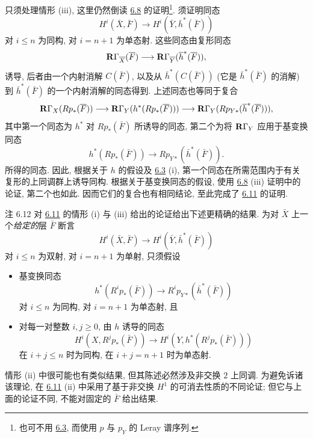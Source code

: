 只须处理情形 (iii), 这里仍然倒读 \hyperref[XII.prop6.8]{6.8} 的证明\footnote[1]{也可不用 \hyperref[XII.cor6.3]{6.3}, 而使用 $p$ 与 $p_Y$ 的 Leray 谱序列.}. 须证明同态
$$
H^{i}(\bar{X},\bar{F})\longrightarrow
H^{i}(\bar{Y},\bar{h}^{\ast}(\bar{F}))
$$
对 $i\leq n$ 为同构, 对 $i=n+1$ 为单态射. 这些同态由复形同态
$$
\mathbf{R}\Gamma_{\overline{X}}(\overline{F})\longrightarrow
\mathbf{R}\Gamma_{\overline{Y}}(\overline{h}^{\ast}(\overline{F})){},
$$
诱导, 后者由一个内射消解 $C(\bar{F})$, 以及从 $\bar{h}^{\ast}(C(\bar{F}))$ (它是 $\bar{h}^{\ast}(\bar{F})$ 的消解) 到 $\bar{h}^{\ast}(\bar{F})$ 的一个内射消解的同态得到. 上述同态也等同于复合
$$
\mathbf{R}\Gamma_X(Rp_{\ast}(\overline{F}))\longrightarrow
\mathbf{R}\Gamma_Y(h^{\ast}(Rp_{\ast}(\overline{F})))\longrightarrow
\mathbf{R}\Gamma_Y(Rp_{Y\ast}(\overline{h}^{\ast}(\overline{F}))){},
$$
其中第一个同态为 $h^{\ast}$ 对 $Rp_{\ast}(\bar{F})$ 所诱导的同态, 第二个为将 $\mathbf{R}\Gamma_Y$ 应用于基变换同态
$$
h^{\ast}(Rp_{\ast}(\bar{F}))\longrightarrow
Rp_{Y\ast}(\bar{h}^{\ast}(\bar{F})).
$$
所得的同态. 因此, 根据关于 $h$ 的假设及 \hyperref[XII.cor6.3]{6.3} (i), 第一个同态在所需范围内于有关复形的上同调群上诱导同构. 根据关于基变换同态的假设, 使用 \hyperref[XII.prop6.8]{6.8} (iii) 证明中的论证, 第二个也如此. 因而它们的复合也有相同结论, 至此完成了 \hyperref[XII.prop6.11]{6.11} 的证明.

\begin{enonce*}[remark]{注 6.12}
对 \hyperref[XII.prop6.11]{6.11} 的情形 (i) 与 (iii) 给出的论证\pageoriginale 给出下述更精确的结果. 为对 $\bar{X}$ 上一个\emph{给定的}层 $\bar{F}$ 断言
$$
H^{i}(\bar{X},\bar{F})\longrightarrow
H^{i}(\bar{Y},\bar{h}^{\ast}(\bar{F}))
$$
对 $i\leq n$ 为双射, 对 $i=n+1$ 为单射, 只须假设
\begin{itemize}
\item[$1^{\circ}$)] 基变换同态
$$
h^{\ast}(R^{i}p_{\ast}(\bar{F}))\longrightarrow
R^{i}p_{Y\ast}(\bar{h}^{\ast}(\bar{F}))
$$
对 $i\leq n$ 为同构, 对 $i=n+1$ 为单态射, 且

\item[$2^{\circ}$)] 对每一对整数 $i,j\geq0$, 由 $h$ 诱导的同态
$$
H^{i}(X,R^{j}p_{\ast}(\bar{F}))\longrightarrow
H^{i}(Y,h^{\ast}(R^{j}p_{\ast}(\bar{F})))
$$
在 $i+j\leq n$ 时为同构, 在 $i+j=n+1$ 时为单态射.
\end{itemize}

情形 (ii) 中很可能也有类似结果, 但其陈述必然涉及非交换 $2$ 上同调. 为避免诉诸该理论, 在 \hyperref[XII.prop6.11]{6.11} (ii) 中采用了基于非交换 $H^1$ 的可消去性质的不同论证; 但它与上面的论证不同, 不能对固定的 $\bar{F}$ 给出结果.
\end{enonce*}


